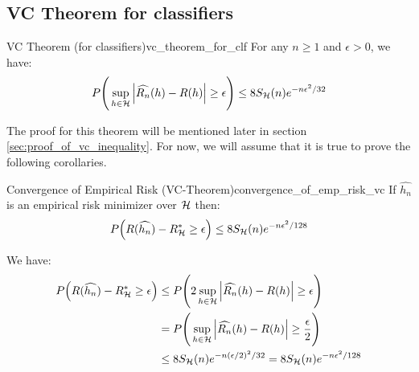 \subsection{VC Theorem for classifiers}
\begin{theorem}{VC Theorem (for classifiers)}{vc_theorem_for_clf}
    For any $n\ge1$ and $\epsilon>0$, we have:
    \begin{align*}
        P\Bigg( 
            \sup_{h\in\mathcal{H}} \Big| 
                \widehat{R_n}(h) - R(h)
             \Big| \ge \epsilon
         \Bigg) \le 8S_{\mathcal{H}}(n) e^{-n\epsilon^2/32}
    \end{align*}
\end{theorem}

\begin{proof*}
    The proof for this theorem will be mentioned later in section \ref{sec:proof_of_vc_inequality}. For now, we will assume that it is true to prove the following corollaries.
\end{proof*}

\begin{corollary}{Convergence of Empirical Risk (VC-Theorem)}{convergence_of_emp_risk_vc}
    If $\widehat{h_n}$ is an empirical risk minimizer over $\mathcal{H}$ then:
    \begin{align*}
        P\Big( 
            R(\widehat{h_n}) - R_{\mathcal{H}}^* \ge \epsilon
         \Big) \le 8S_{\mathcal{H}}(n)e^{-n\epsilon^2/128}
    \end{align*}
\end{corollary}

\begin{proof*}
    We have:
    \begin{align*}
        P\Big( 
            R(\widehat{h_n}) - R_{\mathcal{H}}^* \ge \epsilon
         \Big) 
        &\le 
        P\Bigg( 
            2\sup_{h\in\mathcal{H}} \Big| \widehat{R_n}(h) - R(h) \Big| \ge \epsilon
         \Bigg) \\
        &= 
        P\Bigg( 
            \sup_{h\in\mathcal{H}} \Big| \widehat{R_n}(h) - R(h) \Big| \ge \frac{\epsilon}{2}
         \Bigg) \\
        &\le 8S_{\mathcal{H}}(n)e^{-n(\epsilon/2)^2/32} = 8S_{\mathcal{H}}(n)e^{-n\epsilon^2/128}
    \end{align*}
\end{proof*}


